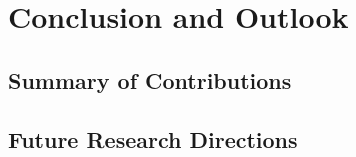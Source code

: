 
\chapter{Conclusion and Outlook}
\label{ch:conclusion_outlook}

\section{Summary of Contributions}
\label{sec:summary_contributions}

\section{Future Research Directions}
\label{sec:future_research}
